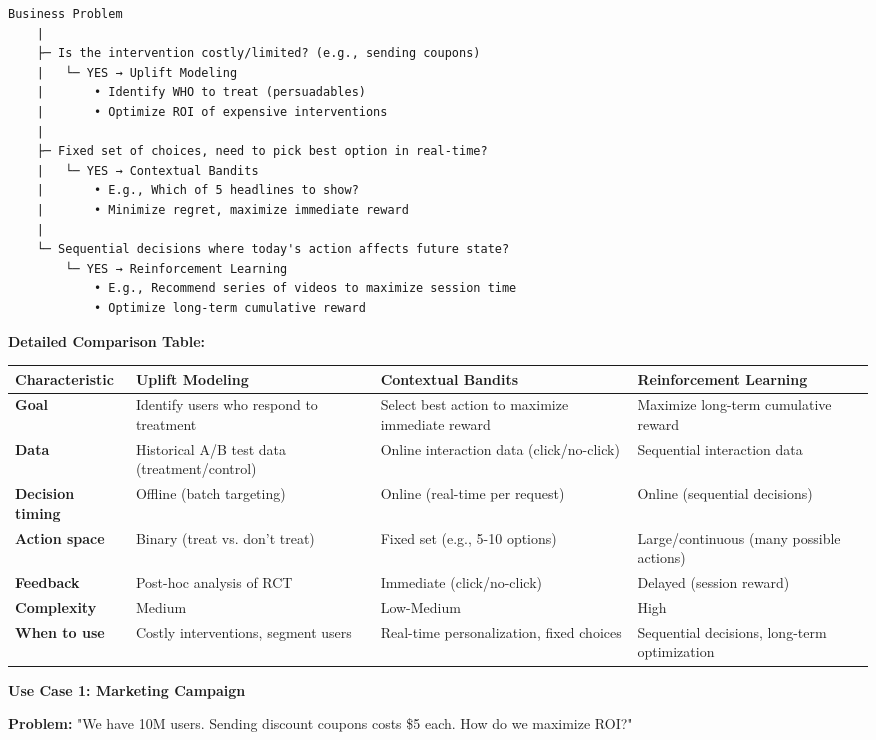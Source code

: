 \documentclass[10pt]{article}
\begin{document}
\begin{verbatim}
Business Problem
    |
    ├─ Is the intervention costly/limited? (e.g., sending coupons)
    |   └─ YES → Uplift Modeling
    |       • Identify WHO to treat (persuadables)
    |       • Optimize ROI of expensive interventions
    |
    ├─ Fixed set of choices, need to pick best option in real-time?
    |   └─ YES → Contextual Bandits
    |       • E.g., Which of 5 headlines to show?
    |       • Minimize regret, maximize immediate reward
    |
    └─ Sequential decisions where today's action affects future state?
        └─ YES → Reinforcement Learning
            • E.g., Recommend series of videos to maximize session time
            • Optimize long-term cumulative reward
\end{verbatim}

\textbf{Detailed Comparison Table:}

\begin{tabular}{|p{2.5cm}|p{3.5cm}|p{3.5cm}|p{3.5cm}|}
\hline
\textbf{Characteristic} & \textbf{Uplift Modeling} & \textbf{Contextual Bandits} & \textbf{Reinforcement Learning} \\
\hline
\textbf{Goal} & Identify users who respond to treatment & Select best action to maximize immediate reward & Maximize long-term cumulative reward \\
\hline
\textbf{Data} & Historical A/B test data (treatment/control) & Online interaction data (click/no-click) & Sequential interaction data \\
\hline
\textbf{Decision timing} & Offline (batch targeting) & Online (real-time per request) & Online (sequential decisions) \\
\hline
\textbf{Action space} & Binary (treat vs. don't treat) & Fixed set (e.g., 5-10 options) & Large/continuous (many possible actions) \\
\hline
\textbf{Feedback} & Post-hoc analysis of RCT & Immediate (click/no-click) & Delayed (session reward) \\
\hline
\textbf{Complexity} & Medium & Low-Medium & High \\
\hline
\textbf{When to use} & Costly interventions, segment users & Real-time personalization, fixed choices & Sequential decisions, long-term optimization \\
\hline
\end{tabular}

\textbf{Use Case 1: Marketing Campaign}

\textbf{Problem:} "We have 10M users. Sending discount coupons costs \$5 each. How do we maximize ROI?"
\end{document}
